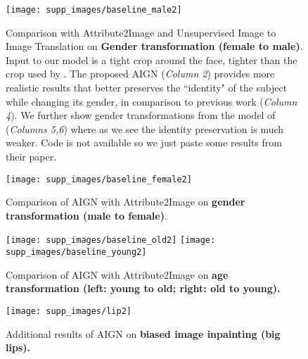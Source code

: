 \documentclass[10pt,twocolumn,letterpaper]{article}
\begin{document}
\begin{bibunit}[ieee]
\begin{appendices}
\begin{figure}[t]
    \centering
    \texttt{[image: supp\_images/baseline\_male2]}
     \centering
    \caption{Comparison with Attribute2Image \cite{DBLP:journals/corr/YanYSL15} and Unsupervised Image to Image Translation \cite{DBLP:journals/corr/DongNWG17} on \textbf{Gender transformation (female to male)}. Input to our model is a tight crop around the face, tighter than the crop used by \cite{DBLP:journals/corr/YanYSL15}. The proposed AIGN (\textit{Column 2}) provides more realistic results that better preserves the ``identity" of the subject while changing its gender, in comparison to previous work \cite{DBLP:journals/corr/YanYSL15} (\textit{Column 4}). We further show gender transformations from the model of \cite{DBLP:journals/corr/DongNWG17} (\textit{Columns 5,6}) where as we see the identity preservation is much weaker. Code is not available so we just paste some results from their paper. }
    \label{fig:baseline-male}
\end{figure}\begin{figure}[t]
    \centering
    \texttt{[image: supp\_images/baseline\_female2]}
     \centering
    \caption{Comparison of AIGN with Attribute2Image \cite{DBLP:journals/corr/YanYSL15}  on \textbf{gender transformation (male to female)}.}
    \label{fig:baseline-female}
\end{figure}\begin{figure}[t]
    \centering
    \texttt{[image: supp\_images/baseline\_old2]}
    \texttt{[image: supp\_images/baseline\_young2]}
     \centering
    \caption{Comparison of AIGN with Attribute2Image \cite{DBLP:journals/corr/YanYSL15} on \textbf{age transformation (left: young to old; right: old to young).}}
    \label{fig:baseline-old}
\end{figure}\begin{figure}[t]
    \centering
    \texttt{[image: supp\_images/lip2]}
     \centering
    \caption{Additional results  of AIGN on \textbf{biased image inpainting (big lips).}}
    \label{fig:more-lips}
\end{figure}%
\end{appendices}
\putbib[refs]
\end{bibunit}
\end{document}
